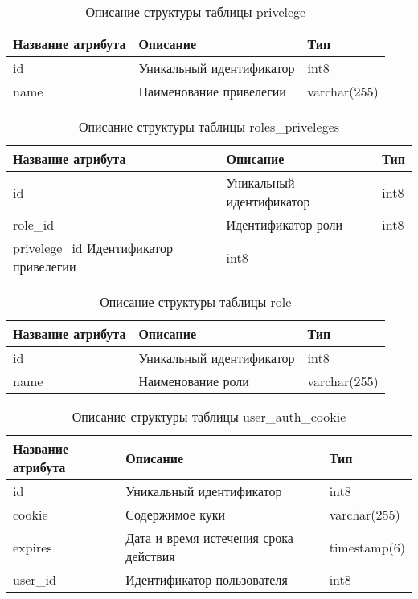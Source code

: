 \begin{table}[H]
  \caption{\onehalfspacing Описание структуры таблицы privelege}\label{database-table-privelege}
  \begin{tabular}{|p{6cm}|p{6cm}|p{4cm}|}
  \hline Название атрибута & Описание & Тип \\
  \hline id & Уникальный идентификатор & int8 \\
  \hline name & Наименование привелегии & varchar(255) \\
  \hline 
  \end{tabular}
\end{table}

\begin{table}[H]
  \caption{\onehalfspacing Описание структуры таблицы roles_priveleges}\label{database-table-roles-priveleges}
  \begin{tabular}{|p{6cm}|p{6cm}|p{4cm}|}
  \hline Название атрибута & Описание & Тип \\
  \hline id & Уникальный идентификатор & int8 \\
  \hline role_id & Идентификатор роли & int8 \\
  \hline privelege_id Идентификатор привелегии & int8 \\
  \hline 
  \end{tabular}
\end{table}

\begin{table}[H]
  \caption{\onehalfspacing Описание структуры таблицы role}\label{database-table-role}
  \begin{tabular}{|p{6cm}|p{6cm}|p{4cm}|}
  \hline Название атрибута & Описание & Тип \\
  \hline id & Уникальный идентификатор & int8 \\
  \hline name & Наименование роли & varchar(255) \\
  \hline
  \end{tabular}
\end{table}

\begin{table}[H]
  \caption{\onehalfspacing Описание структуры таблицы user_auth_cookie}\label{database-table-user-auth-cookie}
  \begin{tabular}{|p{6cm}|p{6cm}|p{4cm}|}
  \hline Название атрибута & Описание & Тип \\
  \hline id & Уникальный идентификатор & int8 \\
  \hline cookie & Содержимое куки & varchar(255) \\
  \hline expires & Дата и время истечения срока действия & timestamp(6) \\
  \hline user_id & Идентификатор пользователя & int8 \\
  \hline
  \end{tabular}
\end{table}

